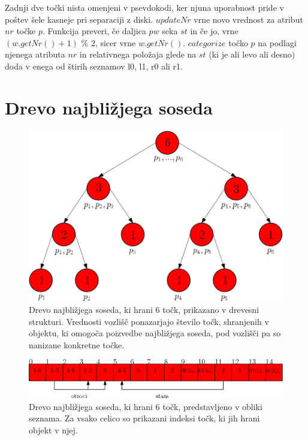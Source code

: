 \documentclass[a4paper, 12pt]{book}
\begin{document}
Zadnji dve točki nista omenjeni v psevdokodi, ker njuna uporabnost pride v poštev šele kasneje pri separaciji z diski. $updateNr$ vrne novo vrednost za atribut $nr$ točke $p$. Funkcija preveri, če daljica $pw$ seka $st$ in če jo, vrne $(w.getNr() + 1)$ $\%$ $2$, sicer vrne $w.getNr()$. $categorize$ točko $p$ na podlagi njenega atributa $nr$ in relativnega položaja glede na $st$ (ki je ali levo ali desno) doda v enega od štirih seznamov l0, l1, r0 ali r1.

\section{Drevo najbližjega soseda}

\begin{figure}
\centerline{\includegraphics[scale=0.5]{pics/nntree-png.png}}
\caption{Drevo najbližjega soseda, ki hrani 6 točk, prikazano v drevesni strukturi. Vrednosti vozlišč ponazarjajo število točk, shranjenih v objektu, ki omogoča poizvedbe najbližjega soseda, pod vozlišči pa so nanizane konkretne točke.}
\label{nntree}
\end{figure}

\begin{figure}
\centerline{\includegraphics[scale=0.5]{pics/nnarray-png.png}}
\caption{Drevo najbližjega soseda, ki hrani 6 točk, predstavljeno v obliki seznama. Za vsako celico so prikazani indeksi točk, ki jih hrani objekt v njej.}
\label{nnarray}
\end{figure}
\end{document}
